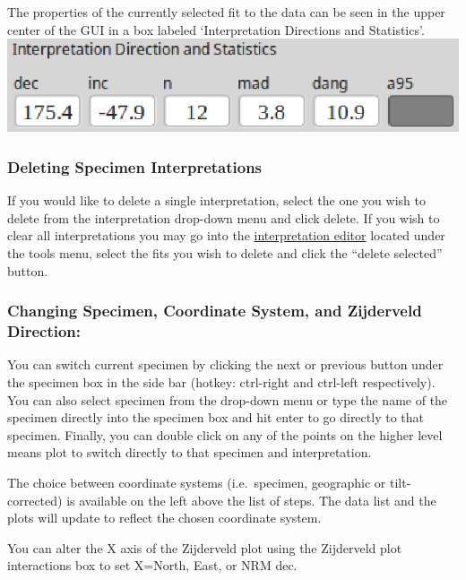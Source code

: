 \documentclass[11pt]{book}
\begin{document}
{{\noindent The properties of the currently selected fit to the data can be seen in the upper center of the GUI in a box labeled `Interpretation Directions and Statistics'.\\

\includegraphics[width=10 cm]{EPSFiles/demag_gui_FitData.eps}

\subsubsection{Deleting Specimen
Interpretations}\label{deleting-specimen-interpretations}

\noindent If you would like to delete a single interpretation, select the one you wish to delete from the interpretation drop-down menu and click delete. If you wish to clear all interpretations you may go into the \hyperref[interpretation-editor]{interpretation editor} located under the tools menu, select the fits you wish to delete and click the ``delete selected'' button.\\

\subsubsection{Changing Specimen, Coordinate System, and Zijderveld Direction:}\label{change-specimen-coord-zijd}

You can switch current specimen by clicking the next or previous button under the specimen box in the side bar (hotkey: ctrl-right and ctrl-left respectively). You can also select specimen from the drop-down menu or type the name of the specimen directly into the specimen box and hit enter to go directly to that specimen. Finally, you can double click on any of the points on the higher level means plot to switch directly to that specimen and interpretation.

\noindent The choice between coordinate systems (i.e.~specimen, geographic or tilt-corrected) is available on the left above the list of steps. The data list and the plots will update to reflect the chosen coordinate system.

\noindent You can alter the X axis of the Zijderveld plot using the Zijderveld plot interactions box to set X=North, East, or NRM dec.

}}
\end{document}
